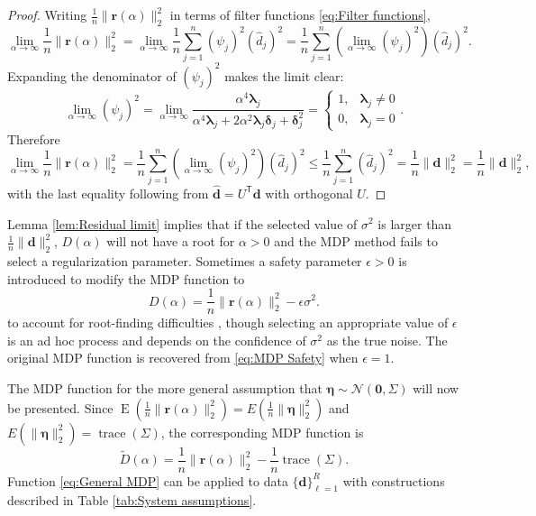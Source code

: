\documentclass[12pt]{article}
\newcommand{\dVec}{\mathbf{d}}	%
\newcommand{\rVec}{\mathbf{r}}	%
\newcommand{\trans}[1]{{#1}^\mathsf{T}}	%
\DeclareMathOperator{\trace}{trace}		%
\newcommand{\dft}[1]{\widehat{#1}}	%
\newcommand{\regparam}{\alpha}  %
\newcommand{\mfilt}{\psi}
\newcommand{\noise}{\eta}	%
\newcommand{\noiseSD}{\sigma}	%
\newcommand{\noiseVec}{\bm{\noise}}	%
\DeclareMathOperator{\E}{E}	%
\newcommand{\zeroVec}{\bm{0}}	%
\newcommand{\svd}[1]{\widehat{#1}}	%
\newcommand{\D}{D}	%
\newcommand{\safeparam}{\epsilon}	%
\begin{document}
\begin{proof}
Writing $\frac{1}{n}\|\rVec(\regparam)\|_2^2$ in terms of filter functions \eqref{eq:Filter functions},
\[\lim_{\regparam\rightarrow\infty} \frac{1}{n}\|\rVec(\regparam)\|_2^2 = \lim_{\regparam\rightarrow\infty} \frac{1}{n} \sum_{j=1}^{n} \left(\mfilt_j\right)^2\left(\dft{d}_j\right)^2 = \frac{1}{n} \sum_{j=1}^{n} \left(\lim_{\regparam\rightarrow\infty}\left(\mfilt_j\right)^2\right)\left(\dft{d}_j\right)^2.\]
Expanding the denominator of $\left(\mfilt_j\right)^2$ makes the limit clear:
\[\lim_{\regparam\rightarrow\infty} \left(\mfilt_j\right)^2 = \lim_{\regparam\rightarrow\infty}\frac{\regparam^4\bm{\lambda}_j}{\regparam^4\bm{\lambda}_j + 2\regparam^2\bm{\lambda}_j\bm{\delta}_j + \bm{\delta}_j^2} = \begin{cases}
1, & \bm{\lambda}_j \neq 0 \\
0, & \bm{\lambda}_j = 0
\end{cases}.\]
Therefore
\[\lim_{\regparam\rightarrow\infty} \frac{1}{n}\|\rVec(\regparam)\|_2^2 = \frac{1}{n} \sum_{j=1}^{n} \left(\lim_{\regparam\rightarrow\infty}\left(\mfilt_j\right)^2\right)\left(\dft{d}_j\right)^2 \leq \frac{1}{n} \sum_{j=1}^{n} \left(\dft{d}_j\right)^2 = \frac{1}{n}\|\svd{\dVec}\|_2^2 = \frac{1}{n}\|\dVec\|_2^2,\]
with the last equality following from $\svd{\dVec} = \trans{U}\dVec$ with orthogonal $U$.
\end{proof}
\noindent Lemma \ref{lem:Residual limit} implies that if the selected value of $\noiseSD^2$ is larger than $\frac{1}{n}\|\dVec\|_2^2$, $\D(\regparam)$ will not have a root for $\regparam > 0$ and the MDP method fails to select a regularization parameter. Sometimes a safety parameter $\safeparam > 0$ is introduced to modify the MDP function to
\begin{equation}
\label{eq:MDP Safety}
\D(\regparam) = \frac{1}{n}\|\rVec(\regparam)\|_2^2 - \safeparam\noiseSD^2.
\end{equation}
to account for root-finding difficulties \cite{ABT,IRTools}, though selecting an appropriate value of $\safeparam$ is an ad hoc process and depends on the confidence of $\noiseSD^2$ as the true noise. The original MDP function is recovered from \eqref{eq:MDP Safety} when $\safeparam = 1$. \par
The MDP function for the more general assumption that $\noiseVec \sim \mathcal{N}(\zeroVec,\Sigma)$ will now be presented. Since $\E(\frac{1}{n}\|\rVec(\regparam)\|_2^2) = E(\frac{1}{n}\|\noiseVec\|_2^2)$ and $E(\|\noiseVec\|_2^2) = \trace(\Sigma)$, the corresponding MDP function is
\begin{equation}
\label{eq:General MDP}
\widetilde{\D}(\regparam) = \frac{1}{n}\|\rVec(\regparam)\|_2^2 - \frac{1}{n}\trace\left(\Sigma\right).
\end{equation}
Function \eqref{eq:General MDP} can be applied to data $\{\dVec\}_{\ell=1}^R$ with constructions described in Table \ref{tab:System assumptions}. 
\end{document}
